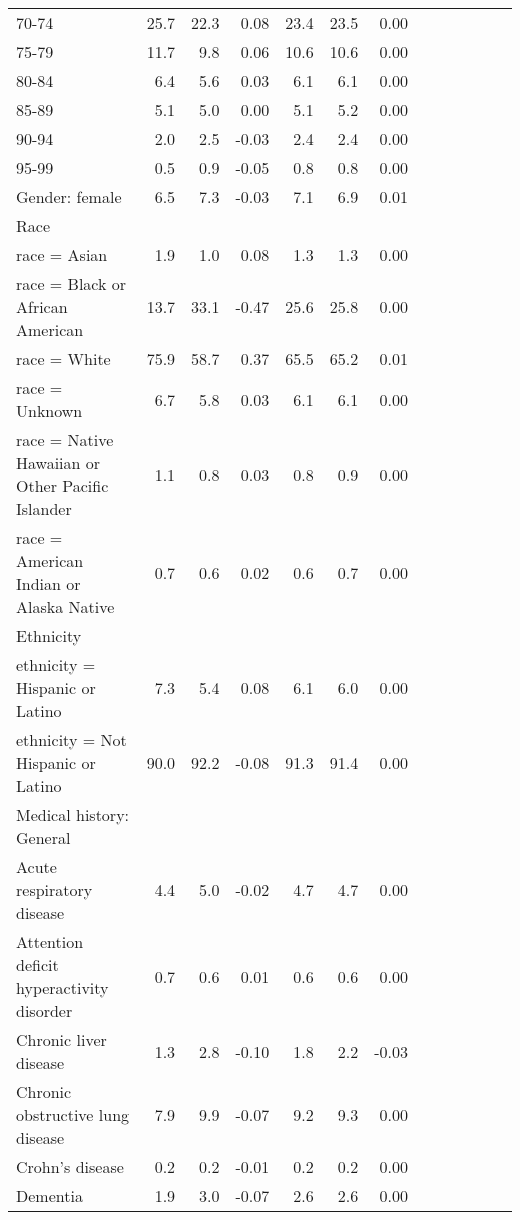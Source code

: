\documentclass[11pt,]{article}
\begin{document}
\begin{longtable}{lrrrrrrrrrrrr}
      70-74 & 25.7 & 22.3 &  0.08 & 23.4 & 23.5 &  0.00 \\ 
      75-79 & 11.7 &  9.8 &  0.06 & 10.6 & 10.6 &  0.00 \\ 
      80-84 &  6.4 &  5.6 &  0.03 &  6.1 &  6.1 &  0.00 \\ 
      85-89 &  5.1 &  5.0 &  0.00 &  5.1 &  5.2 &  0.00 \\ 
      90-94 &  2.0 &  2.5 & -0.03 &  2.4 &  2.4 &  0.00 \\ 
      95-99 &  0.5 &  0.9 & -0.05 &  0.8 &  0.8 &  0.00 \\ 
  Gender: female &  6.5 &  7.3 & -0.03 &  7.1 &  6.9 &  0.01 \\ 
  Race &    &    &     &    &    &     \\ 
      race = Asian &  1.9 &  1.0 &  0.08 &  1.3 &  1.3 &  0.00 \\ 
      race = Black or African American & 13.7 & 33.1 & -0.47 & 25.6 & 25.8 &  0.00 \\ 
      race = White & 75.9 & 58.7 &  0.37 & 65.5 & 65.2 &  0.01 \\ 
      race = Unknown &  6.7 &  5.8 &  0.03 &  6.1 &  6.1 &  0.00 \\ 
      race = Native Hawaiian or Other Pacific Islander &  1.1 &  0.8 &  0.03 &  0.8 &  0.9 &  0.00 \\ 
      race = American Indian or Alaska Native &  0.7 &  0.6 &  0.02 &  0.6 &  0.7 &  0.00 \\ 
  Ethnicity &    &    &     &    &    &     \\ 
      ethnicity = Hispanic or Latino &  7.3 &  5.4 &  0.08 &  6.1 &  6.0 &  0.00 \\ 
      ethnicity = Not Hispanic or Latino & 90.0 & 92.2 & -0.08 & 91.3 & 91.4 &  0.00 \\ 
  Medical history: General &    &    &     &    &    &     \\ 
      Acute respiratory disease &  4.4 &  5.0 & -0.02 &  4.7 &  4.7 &  0.00 \\ 
      Attention deficit hyperactivity disorder &  0.7 &  0.6 &  0.01 &  0.6 &  0.6 &  0.00 \\ 
      Chronic liver disease &  1.3 &  2.8 & -0.10 &  1.8 &  2.2 & -0.03 \\ 
      Chronic obstructive lung disease &  7.9 &  9.9 & -0.07 &  9.2 &  9.3 &  0.00 \\ 
      Crohn's disease &  0.2 &  0.2 & -0.01 &  0.2 &  0.2 &  0.00 \\ 
      Dementia &  1.9 &  3.0 & -0.07 &  2.6 &  2.6 &  0.00 \\ 

\end{longtable}
\end{document}
